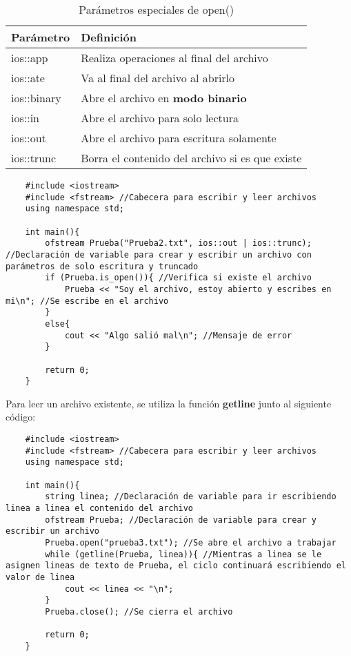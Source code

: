 \begin{table}[h]
    \begin{center}
        \caption{Parámetros especiales de open()}
        \label{tab: 9}
        \begin{tabular}{l l}
            \hline
            \textbf{Parámetro}&\textbf{Definición} \\
            \hline
            ios::app&Realiza operaciones al final del archivo \\
            ios::ate&Va al final del archivo al abrirlo \\
            ios::binary&Abre el archivo en \textbf{modo binario} \\
            ios::in&Abre el archivo para solo lectura \\
            ios::out&Abre el archivo para escritura solamente \\
            ios::trunc&Borra el contenido del archivo si es que existe \\
        \end{tabular}
    \end{center}
\end{table}
\begin{lstlisting}
    #include <iostream>
    #include <fstream> //Cabecera para escribir y leer archivos
    using namespace std;
    
    int main(){
        ofstream Prueba("Prueba2.txt", ios::out | ios::trunc); //Declaración de variable para crear y escribir un archivo con parámetros de solo escritura y truncado
        if (Prueba.is_open()){ //Verifica si existe el archivo
            Prueba << "Soy el archivo, estoy abierto y escribes en mi\n"; //Se escribe en el archivo
        }
        else{
            cout << "Algo salió mal\n"; //Mensaje de error
        }
        
        return 0;
    }
\end{lstlisting}
Para leer un archivo existente, se utiliza la función \textbf{getline} junto al siguiente código:
\begin{lstlisting}
    #include <iostream>
    #include <fstream> //Cabecera para escribir y leer archivos
    using namespace std;
    
    int main(){
        string linea; //Declaración de variable para ir escribiendo linea a linea el contenido del archivo
        ofstream Prueba; //Declaración de variable para crear y escribir un archivo
        Prueba.open("prueba3.txt"); //Se abre el archivo a trabajar
        while (getline(Prueba, linea)){ //Mientras a linea se le asignen lineas de texto de Prueba, el ciclo continuará escribiendo el valor de linea
            cout << linea << "\n";
        }
        Prueba.close(); //Se cierra el archivo
        
        return 0;
    }
\end{lstlisting}